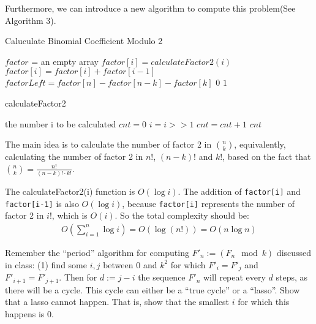 \documentclass[UTF8, a4paper, linespread=1.5]{article}
\begin{document}
Furthermore, we can introduce a new algorithm to compute this problem(See Algorithm 3).
\begin{algorithm}
	\caption{Caluculate Binomial Coefficient Modulo 2}
	\begin{algorithmic}
		\STATE $factor$ = an empty array
		\STATE $factor[i]= calculateFactor2(i)$
		\ENDFOR
		\STATE $factor[i]= factor[i]+factor[i-1]$
		\ENDFOR
		\STATE $factorLeft=factor[n]-factor[n-k]-factor[k]$
		\RETURN $0$
		\ELSE 
		\RETURN $1$
		\ENDIF
	\end{algorithmic}
\end{algorithm}
\begin{algorithm}
	\caption{calculateFactor2}
	\begin{algorithmic}
		\REQUIRE 
		the number i to be calculated 
		\IF {$i==0$}
		\RETURN 0
		\ENDIF
		\STATE $cnt=0$
		\WHILE {the lowest bit in $i$ is 0}
		\STATE $i=i>>1$
		\STATE $cnt=cnt+1$
		\ENDWHILE
		\RETURN $cnt$
	\end{algorithmic}
\end{algorithm}

The main idea is to calculate the number of factor 2 in $\binom{n}{k}$, equivalently, calculating the number of factor 2 in $ n!$, $(n-k)!$ and $k!$, based on the fact that $\binom{n}{k} = \frac{n!}{(n-k)!\cdot k!}$. 

The calculateFactor2(i) function is $O(\log i)$. The addition of \texttt{factor[i]} and \texttt{factor[i-1]} is also  $O(\log i)$, because \texttt{factor[i]} represents the number of factor 2 in $i!$, which is $O(i)$. So the total complexity should be:
\begin{align}
	O(\sum_{i=1}^{n}\log i)=O(\log(n!))=O(n\log n)
\end{align}

\newpage
\begin{thm}{}{}
    Remember the ``period'' algorithm for computing $F'_n := (F_n \mod k)$ discussed in class: (1) find some $i,j$ between $0$ and $k^2$ for which $F'_{i} =  F'_{j}$ and $F'_{i+1} = F'_{j+1}$. Then for $d := j-i$ the sequence $F'_{n}$ will repeat every $d$ steps, as there will be a cycle. This cycle can either be a ``true cycle'' or a ``lasso''. Show that a lasso cannot happen. That is, show that the smallest $i$ for which this happens is $0$.
\end{thm}
\end{document}
